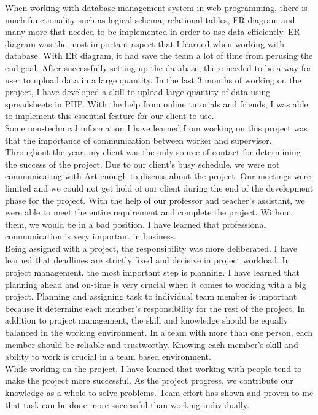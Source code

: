 \documentclass[onecolumn, draftclsnofoot,10pt, compsoc]{IEEEtran}
\begin{document}
\noindent When working with database management system in web programming, there is much functionality such as logical schema, relational tables, ER diagram and many more that needed to be implemented in order to use data efficiently. ER diagram was the most important aspect that I learned when working with database. With ER diagram, it had save the team a lot of time from perusing the end goal. After successfully setting up the database, there needed to be a way for user to upload data in a large quantity. In the last 3 months of working on the project, I have developed a skill to upload large quantity of data using spreadsheets in PHP. With the help from online tutorials and friends, I was able to implement this essential feature for our client to use. \\

\noindent Some non-technical information I have learned from working on this project was that the importance of communication between worker and supervisor. Throughout the year, my client was the only source of contact for determining the success of the project. Due to our client’s busy schedule, we were not communicating with Art enough to discuss about the project. Our meetings were limited and we could not get hold of our client during the end of the development phase for the project. With the help of our professor and teacher’s assistant, we were able to meet the entire requirement and complete the project. Without them, we would be in a bad position. I have learned that professional communication is very important in business. \\

\noindent Being assigned with a project, the responsibility was more deliberated. I have learned that deadlines are strictly fixed and decisive in project workload. In project management, the most important step is planning. I have learned that planning ahead and on-time is very crucial when it comes to working with a big project. Planning and assigning task to individual team member is important because it determine each member’s responsibility for the rest of the project. In addition to project management, the skill and knowledge should be equally balanced in the working environment. In a team with more than one person, each member should be reliable and trustworthy. Knowing each member’s skill and ability to work is crucial in a team based environment.  \\

\noindent While working on the project, I have learned that working with people tend to make the project more successful. As the project progress, we contribute our knowledge as a whole to solve problems. Team effort has shown and proven to me that task can be done more successful than working individually. \\ 
\end{document}
